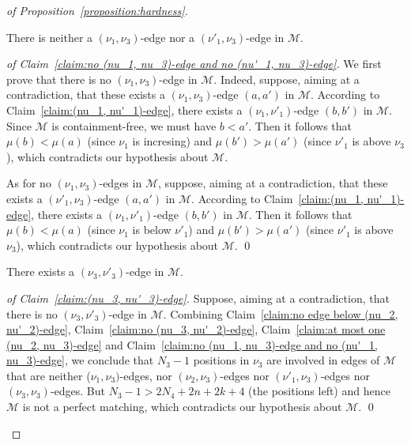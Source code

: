 \begin{proof}[of Proposition~\ref{proposition:hardness}]
  \begin{claim}
    \label{claim:no (nu_1, nu_3)-edge and no (nu'_1, nu_3)-edge}
    There is neither a $(\nu_1, \nu_3)$-edge nor a $(\nu'_1, \nu_3)$-edge
    in $\mathcal{M}$.
  \end{claim}

  \begin{proof}[of Claim~\ref{claim:no (nu_1, nu_3)-edge and no (nu'_1, nu_3)-edge}]
    We first prove that there is no $(\nu_1, \nu_3)$-edge in $\mathcal{M}$.
    Indeed, suppose, aiming at a contradiction, that these exists
    a $(\nu_1, \nu_3)$-edge $(a, a')$ in $\mathcal{M}$.
    According to Claim~\ref{claim:(nu_1, nu'_1)-edge},
    there exists a $(\nu_1, \nu'_1)$-edge $(b, b')$ in $\mathcal{M}$.
    Since $\mathcal{M}$ is containment-free, we must have
    $b < a'$.
    Then it follows that
    $\mu(b) < \mu(a)$ (since $\nu_1$ is incresing) and
    $\mu(b') > \mu(a')$ (since $\nu'_1$ is above $\nu_3$),
    which contradicts our hypothesis about $\mathcal{M}$.

    As for no $(\nu_1, \nu_3)$-edges in $\mathcal{M}$, suppose,
    aiming at a contradiction, that these exists
    a $(\nu'_1, \nu_3)$-edge $(a, a')$ in $\mathcal{M}$.
    According to Claim~\ref{claim:(nu_1, nu'_1)-edge},
    there exists a $(\nu_1, \nu'_1)$-edge $(b, b')$ in $\mathcal{M}$.
    Then it follows that
    $\mu(b) < \mu(a)$ (since $\nu_1$ is below $\nu'_1$) and
    $\mu(b') > \mu(a')$ (since $\nu'_1$ is above $\nu_3$),
    which contradicts our hypothesis about $\mathcal{M}$.
    \qed
  \end{proof}

  \begin{claim}
    \label{claim:(nu_3, nu'_3)-edge}
    There exists a $(\nu_3, \nu'_3)$-edge in $\mathcal{M}$.
  \end{claim}

  \begin{proof}[of Claim~\ref{claim:(nu_3, nu'_3)-edge}]
    Suppose, aiming at a contradiction, that there is no
    $(\nu_3, \nu'_3)$-edge in $\mathcal{M}$.
    Combining
    Claim~\ref{claim:no edge below (nu_2, nu'_2)-edge},
    Claim~\ref{claim:no (nu_3, nu'_2)-edge},
    Claim~\ref{claim:at most one (nu_2, nu_3)-edge}
    and Claim~\ref{claim:no (nu_1, nu_3)-edge and no (nu'_1, nu_3)-edge},
    we conclude that $N_3-1$ positions in $\nu_3$ are involved
    in edges of $\mathcal{M}$ that are
    neither ($\nu_1, \nu_3)$-edges,
    nor $(\nu_2, \nu_3)$-edges
    nor $(\nu'_1, \nu_3)$-edges
    nor $(\nu_3, \nu_3)$-edges.
    But $N_3 - 1 > 2N_4 + 2n + 2k + 4$ (the positions left) and hence
    $\mathcal{M}$ is not a perfect matching,
    which contradicts our hypothesis about $\mathcal{M}$.
    \qed
  \end{proof}


\end{proof}
